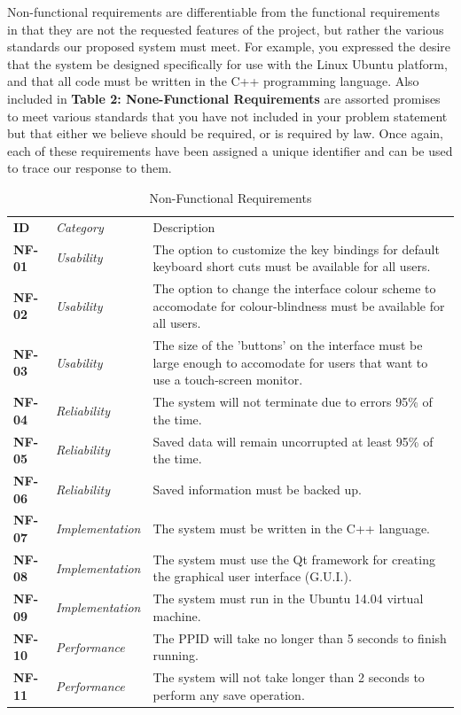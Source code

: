 \documentclass[12pt,letterpaper]{article}
\begin{document}
Non-functional requirements are differentiable from the functional requirements in that they are not the requested features of the project, but
rather the various standards our proposed system must meet. For example, you expressed the desire that the system be designed specifically 
for use with the Linux Ubuntu platform, and that all code must be written in the C++ programming language. Also included in {\bf Table 2: None-Functional Requirements} are
assorted promises to meet various standards that you have not included in your problem statement but that either we believe should be required, 
or is required by law. Once again, each of these requirements have been assigned a unique identifier and can be used to trace our response to them.

\begin{table}[H]
	\caption{Non-Functional Requirements}
	\begin{tabu} to 
	    \tableheader{}ID & Category & Description\\
		NF-01 & Usability & The option to customize the key bindings for default keyboard short cuts must be available for all users.\\
		NF-02 & Usability & The option to change the interface colour scheme to accomodate for colour-blindness must be available for all users.\\
		NF-03 & Usability & The size of the 'buttons' on the interface must be large enough to accomodate for users that want to use a touch-screen monitor.\\
		NF-04 & Reliability & The system will not terminate due to errors 95\% of the time.\\
		NF-05 & Reliability & Saved data will remain uncorrupted at least 95\% of the time. \\
		NF-06 & Reliability & Saved information must be backed up. \\
		NF-07 & Implementation & The system must be written in the C++ language. \\
		NF-08 & Implementation & The system must use the Qt framework for creating the graphical user interface (G.U.I.). \\
		NF-09 & Implementation & The system must run in the Ubuntu 14.04 virtual machine. \\
		NF-10 & Performance & The PPID will take no longer than 5 seconds to finish running. \\
		NF-11 & Performance & The system will not take longer than 2 seconds to perform any save operation. \\

\end{tabu}
\end{table}
\end{document}
